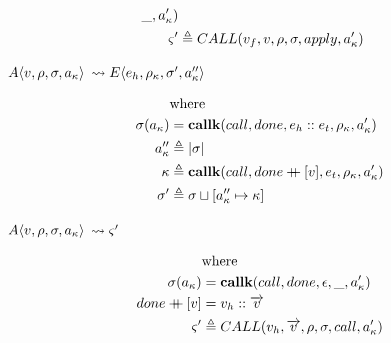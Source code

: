 \documentclass[12pt,draft]{article}
\newcommand\mdoubleplus{\ensuremath{\mathbin{+\mkern-9mu+}}}
\newcommand{\E}[4]{E\langle #1 , #2 , #3 , #4 \rangle}
\newcommand{\A}[4]{A\langle #1 , #2 , #3 , #4 \rangle}
\begin{document}
\begin{multicols*}{2}
\begin{align*}
                       \_ , a_{\kappa}') \\
    \varsigma' &\triangleq CALL(v_f , v , \rho , \sigma , apply , a_{\kappa}')
  \end{align*}
  \begin{center}
    $\A{v}{\cenv}{\cstore}{\ckaddr}$
    $\leadsto \E{e_h}{\cenv_{\kappa}}{\cstore'}{\ckaddr''}$
  \end{center}
  \vspace{-7mm}
  \begin{align*}
    &\text{where} \\
    \cstore(\ckaddr) &= \textbf{callk}(call, done , e_h::e_t ,
                       \cenv_{\ckont} , \ckaddr') \\
    \ckaddr'' &\triangleq |\cstore| \\
    \ckont &\triangleq \textbf{callk}(call, done \mdoubleplus [v] ,
             e_t , \cenv_{\ckont} , \ckaddr') \\
    \cstore' &\triangleq \cstore \sqcup [\ckaddr'' \mapsto \ckont]
  \end{align*}
  \begin{center}
    $\A{v}{\cenv}{\cstore}{\ckaddr}$
    $\leadsto \varsigma' $
  \end{center}
  \vspace{-7mm}
  \begin{align*}
    &\text{where} \\
    \cstore(\ckaddr) &= \textbf{callk}(call, done ,
                       \epsilon , \_ , \ckaddr') \\
    done \mdoubleplus [v] &= v_h :: \overrightarrow{v} \\
    \cstate' &\triangleq CALL(v_h , \overrightarrow{v} ,
               \cenv , \cstore , call , \ckaddr') \\
  \end{align*}
\end{multicols*}

\end{document}
